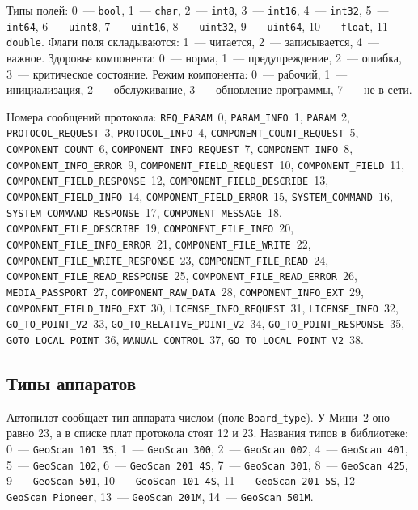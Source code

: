 Типы полей: 0~--- \texttt{bool}, 1~--- \texttt{char}, 2~--- \texttt{int8}, 3~--- \texttt{int16}, 4~--- \texttt{int32}, 5~--- \texttt{int64}, 6~--- \texttt{uint8}, 7~--- \texttt{uint16}, 8~--- \texttt{uint32}, 9~--- \texttt{uint64}, 10~--- \texttt{float}, 11~--- \texttt{double}. Флаги поля складываются: 1~--- читается, 2~--- записывается, 4~--- важное. Здоровье компонента: 0~--- норма, 1~--- предупреждение, 2~--- ошибка, 3~--- критическое состояние. Режим компонента: 0~--- рабочий, 1~--- инициализация, 2~--- обслуживание, 3~--- обновление программы, 7~--- не в сети.

Номера сообщений протокола: \texttt{REQ\_PARAM}~0, \texttt{PARAM\_INFO}~1, \texttt{PARAM}~2, \texttt{PROTOCOL\_REQUEST}~3, \texttt{PROTOCOL\_INFO}~4, \texttt{COMPONENT\_COUNT\_REQUEST}~5, \texttt{COMPONENT\_COUNT}~6, \texttt{COMPONENT\_INFO\_REQUEST}~7, \texttt{COMPONENT\_INFO}~8, \texttt{COMPONENT\_INFO\_ERROR}~9, \texttt{COMPONENT\_FIELD\_REQUEST}~10, \texttt{COMPONENT\_FIELD}~11, \texttt{COMPONENT\_FIELD\_RESPONSE}~12, \texttt{COMPONENT\_FIELD\_DESCRIBE}~13, \texttt{COMPONENT\_FIELD\_INFO}~14, \texttt{COMPONENT\_FIELD\_ERROR}~15, \texttt{SYSTEM\_COMMAND}~16, \texttt{SYSTEM\_COMMAND\_RESPONSE}~17, \texttt{COMPONENT\_MESSAGE}~18, \texttt{COMPONENT\_FILE\_DESCRIBE}~19, \texttt{COMPONENT\_FILE\_INFO}~20, \texttt{COMPONENT\_FILE\_INFO\_ERROR}~21, \texttt{COMPONENT\_FILE\_WRITE}~22, \texttt{COMPONENT\_FILE\_WRITE\_RESPONSE}~23, \texttt{COMPONENT\_FILE\_READ}~24, \texttt{COMPONENT\_FILE\_READ\_RESPONSE}~25, \texttt{COMPONENT\_FILE\_READ\_ERROR}~26, \texttt{MEDIA\_PASSPORT}~27, \texttt{COMPONENT\_RAW\_DATA}~28, \texttt{COMPONENT\_INFO\_EXT}~29, \texttt{COMPONENT\_FIELD\_INFO\_EXT}~30, \texttt{LICENSE\_INFO\_REQUEST}~31, \texttt{LICENSE\_INFO}~32, \texttt{GO\_TO\_POINT\_V2}~33, \texttt{GO\_TO\_RELATIVE\_POINT\_V2}~34, \texttt{GO\_TO\_POINT\_RESPONSE}~35, \texttt{GOTO\_LOCAL\_POINT}~36, \texttt{MANUAL\_CONTROL}~37, \texttt{GO\_TO\_LOCAL\_POINT\_V2}~38.

\subsection*{Типы аппаратов}

Автопилот сообщает тип аппарата числом (поле \texttt{Board\_type}). У Мини~2 оно равно 23, а в списке плат протокола стоят 12 и 23. Названия типов в библиотеке: 0~--- \texttt{GeoScan 101 3S}, 1~--- \texttt{GeoScan 300}, 2~--- \texttt{GeoScan 002}, 4~--- \texttt{GeoScan 401}, 5~--- \texttt{GeoScan 102}, 6~--- \texttt{GeoScan 201 4S}, 7~--- \texttt{GeoScan 301}, 8~--- \texttt{GeoScan 425}, 9~--- \texttt{GeoScan 501}, 10~--- \texttt{GeoScan 101 4S}, 11~--- \texttt{GeoScan 201 5S}, 12~--- \texttt{GeoScan Pioneer}, 13~--- \texttt{GeoScan 201M}, 14~--- \texttt{GeoScan 501M}.

